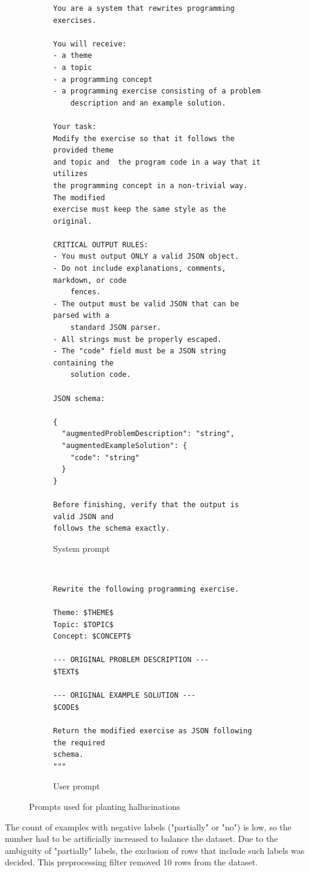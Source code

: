\documentclass[english, 12pt, a4paper, sci, utf8, a-2b, online]{../definitions/aaltothesis}
\begin{document}
\begin{figure}
    \centering
    \begin{subfigure}[b]{0.5\textwidth}
        \centering
    \begin{verbatim}
You are a system that rewrites programming exercises.

You will receive:
- a theme
- a topic
- a programming concept
- a programming exercise consisting of a problem 
    description and an example solution.

Your task:
Modify the exercise so that it follows the provided theme
and topic and  the program code in a way that it utilizes
the programming concept in a non-trivial way. The modified 
exercise must keep the same style as the original.

CRITICAL OUTPUT RULES:
- You must output ONLY a valid JSON object.
- Do not include explanations, comments, markdown, or code
    fences.
- The output must be valid JSON that can be parsed with a
    standard JSON parser.
- All strings must be properly escaped.
- The "code" field must be a JSON string containing the
    solution code.

JSON schema:

{
  "augmentedProblemDescription": "string",
  "augmentedExampleSolution": {
    "code": "string"
  }
}

Before finishing, verify that the output is valid JSON and 
follows the schema exactly.
\end{verbatim}
        \caption{System prompt}
        \label{lst:augment_system_prompt}
    \end{subfigure}%
    ~ 
    \begin{subfigure}[b]{0.5\textwidth}
        \centering
\begin{verbatim}
Rewrite the following programming exercise.

Theme: $THEME$
Topic: $TOPIC$
Concept: $CONCEPT$

--- ORIGINAL PROBLEM DESCRIPTION ---
$TEXT$

--- ORIGINAL EXAMPLE SOLUTION ---
$CODE$

Return the modified exercise as JSON following the required
schema.
"""
\end{verbatim}
    \caption{User prompt}
    \label{lst:augment_user_prompt}
    \end{subfigure}
    \caption{Prompts used for planting hallucinations}
\end{figure}
    
The count of examples with negative labels ("partially" or "no") is low, so the number had to be artificially increased to balance the dataset.  Due to the ambiguity of "partially" labels, the exclusion of rows that include such labels was decided. This preprocessing filter removed 10 rows from the dataset.
\end{document}
